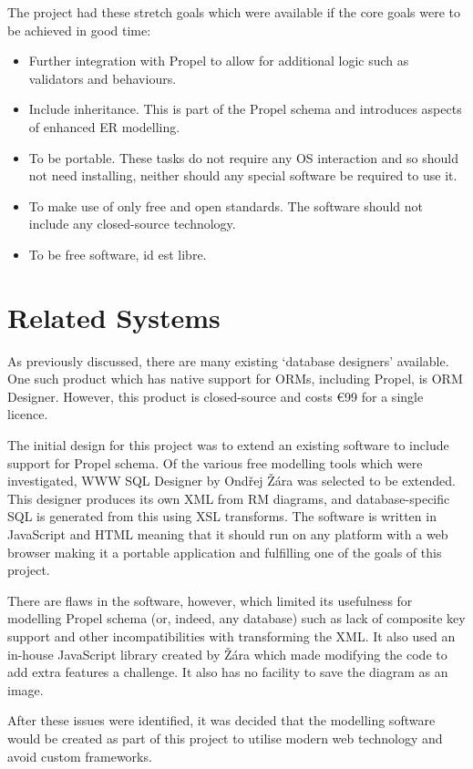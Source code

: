The project had these stretch goals which were available if the core goals were to be achieved in good time:
\begin{itemize}
	\item Further integration with Propel to allow for additional logic such as validators and behaviours.
	\item Include inheritance. This is part of the Propel schema and introduces aspects of enhanced ER modelling.
	\item To be portable. These tasks do not require any OS interaction and so should not need installing, neither should any special software be required to use it.
	\item To make use of only free and open standards. The software should not include any closed-source technology.
	\item To be free software, id est libre.
\end{itemize}

\section{Related Systems}
As previously discussed, there are many existing `database designers' available. One such product which has native support for ORMs, including Propel, is ORM Designer. However, this product is closed-source and costs \euro99 for a single licence.

The initial design for this project was to extend an existing software to include support for Propel schema. Of the various free modelling tools which were investigated, WWW SQL Designer by Ond\v{r}ej \v{Z}\'{a}ra was selected to be extended. This designer produces its own XML from RM diagrams, and database-specific SQL is generated from this using XSL transforms. The software is written in JavaScript and HTML meaning that it should run on any platform with a web browser making it a portable application and fulfilling one of the goals of this project.

There are flaws in the software, however, which limited its usefulness for modelling Propel schema (or, indeed, any database) such as lack of composite key support and other incompatibilities with transforming the XML. It also used an in-house JavaScript library created by \v{Z}\'{a}ra which made modifying the code to add extra features a challenge. It also has no facility to save the diagram as an image.

After these issues were identified, it was decided that the modelling software would be created as part of this project to utilise modern web technology and avoid custom frameworks.